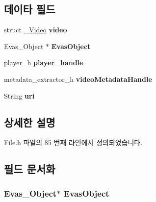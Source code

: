 \subsection*{데이타 필드}
\begin{DoxyCompactItemize}
\item 
\hypertarget{struct___video_extends_aa5784e2c1293cd9248e7bd28183fc1f8}{struct \hyperlink{struct___video}{\-\_\-\-Video} {\bfseries video}}\label{struct___video_extends_aa5784e2c1293cd9248e7bd28183fc1f8}

\item 
\hypertarget{struct___video_extends_ae90b76aa97f5689ba22a80cbf6f95a84}{Evas\-\_\-\-Object $\ast$ {\bfseries Evas\-Object}}\label{struct___video_extends_ae90b76aa97f5689ba22a80cbf6f95a84}

\item 
\hypertarget{struct___video_extends_acdbf0738be9fa70a60412d48cad881ee}{player\-\_\-h {\bfseries player\-\_\-handle}}\label{struct___video_extends_acdbf0738be9fa70a60412d48cad881ee}

\item 
\hypertarget{struct___video_extends_a0c761970ca029f0974eadbb58090641c}{metadata\-\_\-extractor\-\_\-h {\bfseries video\-Metadata\-Handle}}\label{struct___video_extends_a0c761970ca029f0974eadbb58090641c}

\item 
\hypertarget{struct___video_extends_ac0b02717b928a36338653c49b0821365}{String {\bfseries uri}}\label{struct___video_extends_ac0b02717b928a36338653c49b0821365}

\end{DoxyCompactItemize}


\subsection{상세한 설명}


File.\-h 파일의 85 번째 라인에서 정의되었습니다.



\subsection{필드 문서화}
\hypertarget{struct___video_extends_ae90b76aa97f5689ba22a80cbf6f95a84}{
\subsubsection[{Evas\-Object}]{\setlength{\rightskip}{0pt plus 5cm}Evas\-\_\-\-Object$\ast$ Evas\-Object}}\label{struct___video_extends_ae90b76aa97f5689ba22a80cbf6f95a84}


